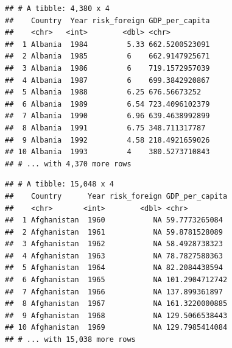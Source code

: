 \documentclass[11pt,]{article}
\newenvironment{Shaded}{\begin{snugshade}}{\end{snugshade}}
\newcommand{\KeywordTok}[1]{\textcolor[rgb]{0.13,0.29,0.53}{\textbf{#1}}}
\newcommand{\DataTypeTok}[1]{\textcolor[rgb]{0.13,0.29,0.53}{#1}}
\newcommand{\StringTok}[1]{\textcolor[rgb]{0.31,0.60,0.02}{#1}}
\newcommand{\CommentTok}[1]{\textcolor[rgb]{0.56,0.35,0.01}{\textit{#1}}}
\newcommand{\OperatorTok}[1]{\textcolor[rgb]{0.81,0.36,0.00}{\textbf{#1}}}
\newcommand{\NormalTok}[1]{#1}
\begin{document}
\begin{verbatim}
## # A tibble: 4,380 x 4
##    Country  Year risk_foreign GDP_per_capita
##    <chr>   <int>        <dbl> <chr>         
##  1 Albania  1984         5.33 662.5200523091
##  2 Albania  1985         6    662.9147925671
##  3 Albania  1986         6    719.1572957039
##  4 Albania  1987         6    699.3842920867
##  5 Albania  1988         6.25 676.56673252  
##  6 Albania  1989         6.54 723.4096102379
##  7 Albania  1990         6.96 639.4638992899
##  8 Albania  1991         6.75 348.711317787 
##  9 Albania  1992         4.58 218.4921659026
## 10 Albania  1993         4    380.5273710843
## # ... with 4,370 more rows
\end{verbatim}

\begin{Shaded}
\end{Shaded}

\begin{verbatim}
## # A tibble: 15,048 x 4
##    Country      Year risk_foreign GDP_per_capita
##    <chr>       <int>        <dbl> <chr>         
##  1 Afghanistan  1960           NA 59.7773265084 
##  2 Afghanistan  1961           NA 59.8781528089 
##  3 Afghanistan  1962           NA 58.4928738323 
##  4 Afghanistan  1963           NA 78.7827580363 
##  5 Afghanistan  1964           NA 82.2084438594 
##  6 Afghanistan  1965           NA 101.2904712742
##  7 Afghanistan  1966           NA 137.899361897 
##  8 Afghanistan  1967           NA 161.3220000885
##  9 Afghanistan  1968           NA 129.5066538443
## 10 Afghanistan  1969           NA 129.7985414084
## # ... with 15,038 more rows
\end{verbatim}

\begin{Shaded}
\end{Shaded}
\end{document}
